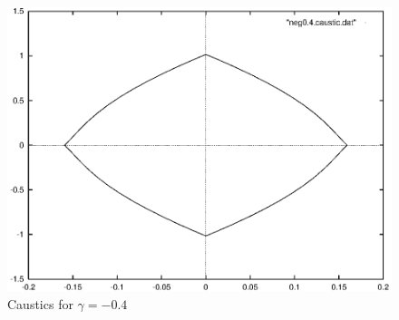 \documentclass[a4paper]{IEEEtran}
\begin{document}
    \begin{figure}
        \caption{Caustics for $\gamma = -0.4$}
        \label{fig:caustics-gamma-0-4} 
        \begin{center}
            \includegraphics[width=\columnwidth]{images/neg0-4-caustic.eps} 
        \end{center}
    \end{figure} 
\end{document}
